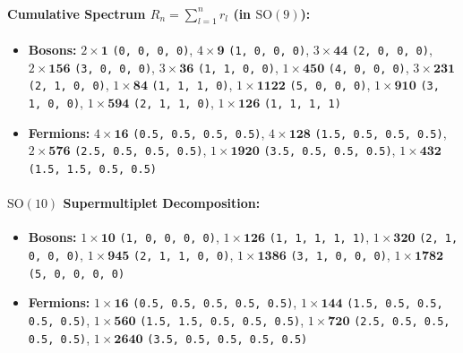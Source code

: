\documentclass[11pt,a4paper]{article}
\begin{document}
\paragraph{Cumulative Spectrum $R_n = \sum_{l=1}^n r_l$ (in $\mathrm{SO}(9)$):}
\begin{itemize}
    \item \textbf{Bosons:} $2 \times \mathbf{1}$ \texttt{(0, 0, 0, 0)}, $4 \times \mathbf{9}$ \texttt{(1, 0, 0, 0)}, $3 \times \mathbf{44}$ \texttt{(2, 0, 0, 0)}, $2 \times \mathbf{156}$ \texttt{(3, 0, 0, 0)}, $3 \times \mathbf{36}$ \texttt{(1, 1, 0, 0)}, $1 \times \mathbf{450}$ \texttt{(4, 0, 0, 0)}, $3 \times \mathbf{231}$ \texttt{(2, 1, 0, 0)}, $1 \times \mathbf{84}$ \texttt{(1, 1, 1, 0)}, $1 \times \mathbf{1122}$ \texttt{(5, 0, 0, 0)}, $1 \times \mathbf{910}$ \texttt{(3, 1, 0, 0)}, $1 \times \mathbf{594}$ \texttt{(2, 1, 1, 0)}, $1 \times \mathbf{126}$ \texttt{(1, 1, 1, 1)}
    \item \textbf{Fermions:} $4 \times \mathbf{16}$ \texttt{(0.5, 0.5, 0.5, 0.5)}, $4 \times \mathbf{128}$ \texttt{(1.5, 0.5, 0.5, 0.5)}, $2 \times \mathbf{576}$ \texttt{(2.5, 0.5, 0.5, 0.5)}, $1 \times \mathbf{1920}$ \texttt{(3.5, 0.5, 0.5, 0.5)}, $1 \times \mathbf{432}$ \texttt{(1.5, 1.5, 0.5, 0.5)}
\end{itemize}
\paragraph{$\mathrm{SO}(10)$ Supermultiplet Decomposition:}
\begin{itemize}
    \item \textbf{Bosons:} $1 \times \mathbf{10}$ \texttt{(1, 0, 0, 0, 0)}, $1 \times \mathbf{126}$ \texttt{(1, 1, 1, 1, 1)}, $1 \times \mathbf{320}$ \texttt{(2, 1, 0, 0, 0)}, $1 \times \mathbf{945}$ \texttt{(2, 1, 1, 0, 0)}, $1 \times \mathbf{1386}$ \texttt{(3, 1, 0, 0, 0)}, $1 \times \mathbf{1782}$ \texttt{(5, 0, 0, 0, 0)}
    \item \textbf{Fermions:} $1 \times \mathbf{16}$ \texttt{(0.5, 0.5, 0.5, 0.5, 0.5)}, $1 \times \mathbf{144}$ \texttt{(1.5, 0.5, 0.5, 0.5, 0.5)}, $1 \times \mathbf{560}$ \texttt{(1.5, 1.5, 0.5, 0.5, 0.5)}, $1 \times \mathbf{720}$ \texttt{(2.5, 0.5, 0.5, 0.5, 0.5)}, $1 \times \mathbf{2640}$ \texttt{(3.5, 0.5, 0.5, 0.5, 0.5)}
\end{itemize}
\end{document}
